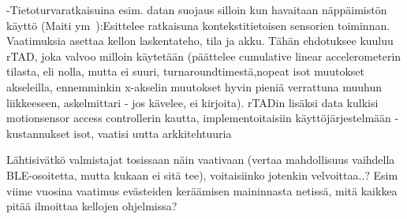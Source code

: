 \documentclass[finnish]{tktltiki2}
\theoremstyle{definition}
\theoremstyle{remark}
\begin{document}
-Tietoturvaratkaisuina esim. datan suojaus silloin kun havaitaan näppäimistön käyttö (Maiti ym~\cite{maiti}):Esittelee ratkaisuna kontekstitietoisen sensorien toiminnan. Vaatimuksia asettaa kellon laskentateho, tila ja akku. Tähän ehdotuksee kuuluu rTAD, joka valvoo milloin käytetään (päättelee cumulative linear accelerometerin tilasta, eli nolla, mutta ei suuri, turnaroundtimestä,nopeat isot muutokset akseleilla, ennemminkin x-akselin muutokset hyvin pieniä verrattuna muuhun liikkeeseen, askelmittari - jos kävelee, ei kirjoita). rTADin lisäksi data kulkisi motionsensor access controllerin kautta, implementoitaisiin käyttöjärjestelmään - kustannukset isot, vaatisi uutta arkkitehtuuria\linebreak

Lähtisivätkö valmistajat tosissaan näin vaativaan (vertaa mahdollisuus vaihdella BLE-osoitetta, mutta kukaan ei sitä tee), voitaisiinko jotenkin velvoittaa..? Esim viime vuosina vaatimus evästeiden keräämisen maininnasta netissä, mitä kaikkea pitää ilmoittaa kellojen ohjelmissa?




\pagebreak
%
%
% 
%







% 
\end{document}
